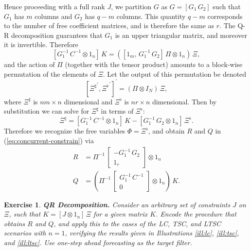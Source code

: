 \documentclass[a4paper]{book}
\newtheorem{Exercise}{Exercise}
\begin{document}
 Hence  proceeding with a full rank $J$, we partition $G$ as $G = [ G_1 \, G_2]$ 
 such that $G_1$ has $m$ columns and $G_2$
 has $q-m$ columns.  This quantity $q-m$ corresponds to the number 
 of free coefficient matrices, and is therefore the same as $r$.
 The Q-R decomposition guarantees that $G_1$ is an upper triangular matrix, 
 and moreover it is invertible.   Therefore
 \[
  \left[ G_1^{-1} \, C^{-1} \otimes 1_n \right] \, K  = 
  \left( \left[ 1_m , \, G_1^{-1} \, G_2 \right] \, \Pi \otimes 1_n  \right) \, \Xi,
\]
 and the action of $\Pi$ (together with the tensor product) amounts
 to a block-wise permutation of the elements of $\Xi$.
  Let the output of this permutation be denoted
\[
   { \left[ { \Xi^{\sharp} }^{\prime},  {  \Xi^{\flat} }^{\prime}  \right] }^{\prime} =
 \left( \Pi \otimes I_N \right) \, \Xi,
\]
 where $ {\Xi}^{\sharp}$ is $n m \times n$ dimensional and 
 $ {\Xi}^{\flat}$ is $n r \times n$ dimensional.  
 Then  by substitution we can solve for ${\Xi}^{\sharp}$ in terms of ${\Xi}^{\flat}$:
\[
  {\Xi}^{\sharp} =  \left[ G_1^{-1} \, C^{-1} \otimes 1_n \right] \, 
  K - \left[  G_1^{-1} \, G_2  \otimes 1_n   \right] \, {\Xi}^{\flat}.
\]
 Therefore we recognize the free variables $\Phi = {\Xi}^{\flat}$,
 and obtain $R$ and $Q$ in (\ref{eq:concurrent-constrain}) via
\begin{align*}
   R & = \Pi^{-1} \, \left[ \begin{array}{c} - G_1^{-1} \, G_2 \\ 1_{r} \end{array} \right] \otimes 1_n  \\
  Q & = \left( \Pi^{-1}  \, \left[ \begin{array}{c}  G_1^{-1} \, C^{-1} \\ 0 \end{array} \right] \otimes 1_n  \right) \, K.
\end{align*}
   
 \begin{Exercise} {\bf QR Decomposition.} \rm
 \label{exer:qr.constraint}
  Consider an arbitrary set of constraints $J$ on $\Xi$, such that
    $   K = [ J \otimes 1_n ] \, \Xi$ for a given matrix $K$.  
    Encode the procedure that obtains $R$ and $Q$, and apply this
    to the cases of the LC, TSC, and LTSC scenarios with $n=1$, verifying the results
    given in Illustrations \ref{ill:lc}, \ref{ill:tsc}, and \ref{ill:ltsc}.
    Use one-step ahead forecasting as the target filter.
 \end{Exercise}
 
\end{document}
